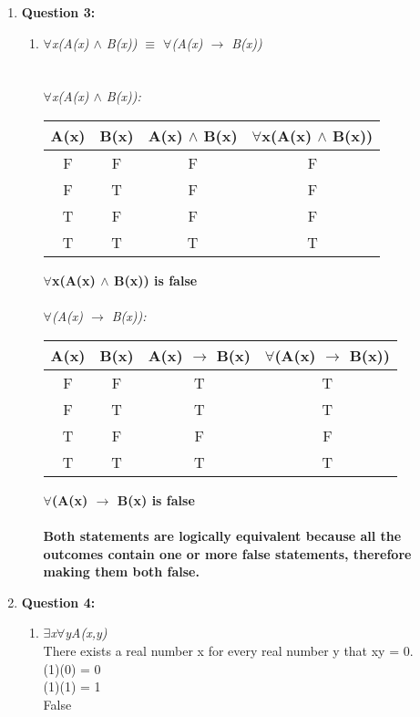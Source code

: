 \documentclass[11pt]{article}
\begin{document}
\begin{enumerate}
\item %
\textbf {Question 3: }
\begin {enumerate} [label = (\alph*)]
\item %
\textit {$\forall$x(A(x) $\land$ B(x)) $\equiv$ $\forall$(A(x) $\to$ B(x)) \\}
\\ \\
\textit {$\forall$x(A(x) $\land$ B(x)): \\}
    \begin {tabular}{c|c|c|c}
        \textbf {A(x)} & \textbf {B(x)} & \textbf {A(x) $\land$ B(x)} & \textbf {$\forall$x(A(x) $\land$ B(x))} \\
        \hline
        F & F & F & F \\
        F & T & F & F \\
        \hline
        T & F & F & F \\
        T & T & T & T \\
    \end{tabular} 
\textbf {$\forall$x(A(x) $\land$ B(x)) is false} \\ \\
\textit {$\forall$(A(x) $\to$ B(x)): \\}
    \begin {tabular} {c|c|c|c}
        \textbf {A(x)} & \textbf {B(x)} & \textbf {A(x) $\to$ B(x)} & \textbf {$\forall$(A(x) $\to$ B(x))} \\
        \hline
        F & F & T & T \\
        F & T & T & T \\
        \hline
        T & F & F & F \\
        T & T & T & T \\
    \end {tabular}
\textbf {$\forall$(A(x) $\to$ B(x) is false} \\ \\
\textbf {Both statements are logically equivalent because all the outcomes contain one or more false statements, therefore making them both false.}
\end {enumerate}

\item %
\textbf {Question 4: }
\begin {enumerate} [label = (\alph*)] 
\item %
\textit {$\exists$x$\forall$yA(x,y)} \\
There exists a real number x for every real number y that xy = 0. \\
(1)(0) = 0 \\
(1)(1) = 1 \\
False


\end{enumerate}
\end{enumerate}
\end{document}
